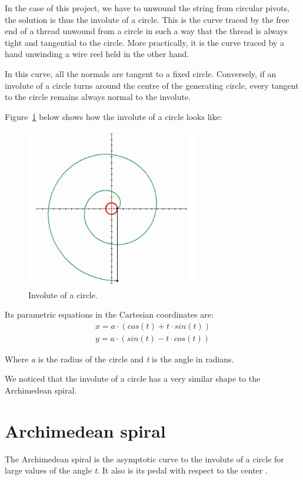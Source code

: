 In the case of this project, we have to unwound the string from circular pivots, the solution is thus the involute of a circle. This is the curve traced by the free end of a thread unwound from a circle in such a way that the thread is always tight and tangential to the circle. More practically, it is the curve traced by a hand unwinding a wire reel held in the other hand.

In this curve, all the normals are tangent to a fixed circle. Conversely, if an involute of a circle turns around the centre of the generating circle, every tangent to the circle remains always normal to the involute.

Figure~\ref{fig:involute} below shows how the involute of a circle looks like:

\begin{figure}[htbp]
	\centering
	\includegraphics[height=70mm]{chapters/figures/motion_planning/involute.jpg}
	\caption{Involute of a circle.}
	\label{fig:involute}
\end{figure}

Its parametric equations in the Cartesian coordinates are:
\begin{equation*}
\begin{split}
x = a \cdot (cos(t) + t \cdot sin(t)) \\ 
y = a \cdot (sin(t) - t \cdot cos(t))
\end{split}
\end{equation*}

Where \textit{a} is the radius of the circle and \textit{t} is the angle in radians.

We noticed that the involute of a circle has a very similar shape to the Archimedean spiral.

\section{Archimedean spiral}
The Archimedean spiral is the asymptotic curve to the involute of a circle for large values of the angle \textit{t}. It also is its pedal with respect to the center \cite{weisstein2003pedal}.

